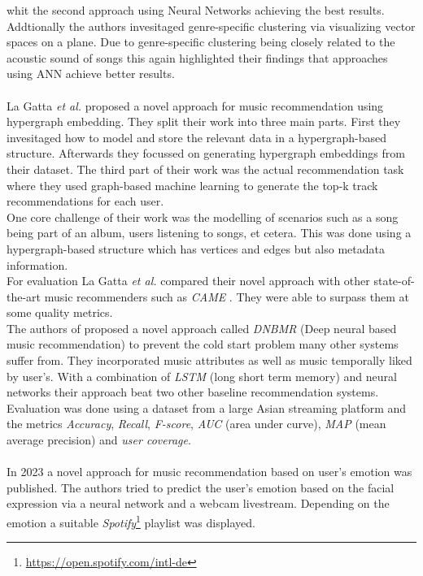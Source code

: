 \documentclass[runningheads,a4paper]{llncs}
\begin{document}
whit the second approach using Neural Networks achieving the best results. \\
Addtionally the authors invesitaged genre-specific clustering via visualizing vector spaces on a plane. 
Due to genre-specific clustering being closely related to the acoustic sound of songs this again highlighted their findings that approaches 
using ANN achieve better results. \cite{niyazov2021content}\\
\\
La Gatta \textit{et al.} proposed a novel approach for music recommendation using hypergraph embedding.
They split their work into three main parts.
First they invesitaged how to model and store the relevant data in a hypergraph-based structure.
Afterwards they focussed on generating hypergraph embeddings from their dataset.
The third part of their work was the actual recommendation task where they used graph-based machine learning to 
generate the top-k track recommendations for each user. \\
One core challenge of their work was the modelling of scenarios such as a song being part of an album, users listening to songs, et cetera.
This was done using a hypergraph-based structure which has vertices and edges but also metadata information.\\
For evaluation La Gatta \textit{et al.} compared their novel approach with other state-of-the-art music recommenders such as \textit{CAME} \cite{wang2020came}.
They were able to surpass them at some quality metrics. \cite{la2022music}
\\
The authors of 
\cite{singh2022novel} proposed a novel approach called \textit{DNBMR} (Deep neural based music recommendation) 
to prevent the cold start problem many other systems suffer from. 
They incorporated music attributes as well as music temporally liked by user's.
With a combination of \textit{LSTM} (long short term memory) and neural networks their approach beat two other baseline recommendation systems.
Evaluation was done using a dataset from a large Asian streaming platform and the metrics \textit{Accuracy}, \textit{Recall}, \textit{F-score},
\textit{AUC} (area under curve), \textit{MAP} (mean average precision) and \textit{user coverage}.\\
\\
In 2023 a novel approach for music recommendation based on user's emotion was published. 
The authors tried to predict the user's emotion based on the facial expression via a neural network and a webcam livestream.
Depending on the emotion a suitable \textit{Spotify}\footnote{\url{https://open.spotify.com/intl-de}} playlist was displayed.
\end{document}
